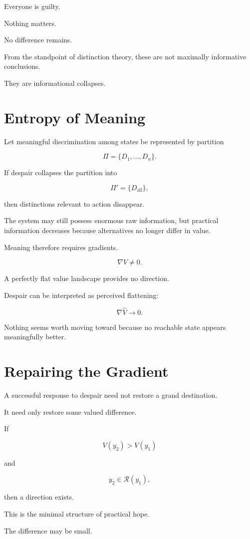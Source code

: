 \documentclass[11pt,oneside]{book}
\theoremstyle{definition}
\theoremstyle{remark}
\newcommand{\R}{\mathcal{R}}
\begin{document}
Everyone is guilty.

Nothing matters.

No difference remains.

From the standpoint of distinction theory, these are not maximally informative conclusions.

They are informational collapses.

\section{Entropy of Meaning}

Let meaningful discrimination among states be represented by partition

\[
\Pi
=
\{D_1,\ldots,D_n\}.
\]

If despair collapses the partition into

\[
\Pi'
=
\{D_{\mathrm{all}}\},
\]

then distinctions relevant to action disappear.

The system may still possess enormous raw information, but practical information decreases because alternatives no longer differ in value.

Meaning therefore requires gradients.

\[
\nabla V\neq0.
\]

A perfectly flat value landscape provides no direction.

Despair can be interpreted as perceived flattening:

\[
\nabla \widehat V\rightarrow0.
\]

Nothing seems worth moving toward because no reachable state appears meaningfully better.

\section{Repairing the Gradient}

A successful response to despair need not restore a grand destination.

It need only restore some valued difference.

If

\[
V(y_2)>V(y_1)
\]

and

\[
y_2\in\R(y_1),
\]

then a direction exists.

This is the minimal structure of practical hope.

The difference may be small.
\end{document}
